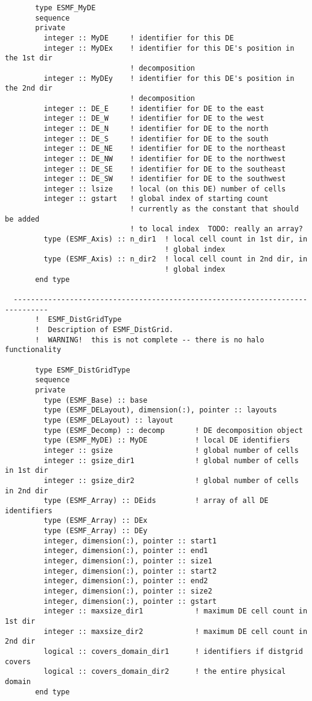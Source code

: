 \begin{verbatim}
       type ESMF_MyDE
       sequence
       private
         integer :: MyDE     ! identifier for this DE
         integer :: MyDEx    ! identifier for this DE's position in the 1st dir
                             ! decomposition
         integer :: MyDEy    ! identifier for this DE's position in the 2nd dir
                             ! decomposition
         integer :: DE_E     ! identifier for DE to the east
         integer :: DE_W     ! identifier for DE to the west
         integer :: DE_N     ! identifier for DE to the north
         integer :: DE_S     ! identifier for DE to the south
         integer :: DE_NE    ! identifier for DE to the northeast
         integer :: DE_NW    ! identifier for DE to the northwest
         integer :: DE_SE    ! identifier for DE to the southeast
         integer :: DE_SW    ! identifier for DE to the southwest
         integer :: lsize    ! local (on this DE) number of cells
         integer :: gstart   ! global index of starting count
                             ! currently as the constant that should be added
                             ! to local index  TODO: really an array?
         type (ESMF_Axis) :: n_dir1  ! local cell count in 1st dir, in
                                     ! global index
         type (ESMF_Axis) :: n_dir2  ! local cell count in 2nd dir, in
                                     ! global index
       end type
 
  ------------------------------------------------------------------------------
       !  ESMF_DistGridType
       !  Description of ESMF_DistGrid. 
       !  WARNING!  this is not complete -- there is no halo functionality
 
       type ESMF_DistGridType
       sequence
       private
         type (ESMF_Base) :: base
         type (ESMF_DELayout), dimension(:), pointer :: layouts
         type (ESMF_DELayout) :: layout
         type (ESMF_Decomp) :: decomp       ! DE decomposition object
         type (ESMF_MyDE) :: MyDE           ! local DE identifiers
         integer :: gsize                   ! global number of cells
         integer :: gsize_dir1              ! global number of cells in 1st dir
         integer :: gsize_dir2              ! global number of cells in 2nd dir
         type (ESMF_Array) :: DEids         ! array of all DE identifiers
         type (ESMF_Array) :: DEx
         type (ESMF_Array) :: DEy
         integer, dimension(:), pointer :: start1
         integer, dimension(:), pointer :: end1
         integer, dimension(:), pointer :: size1
         integer, dimension(:), pointer :: start2
         integer, dimension(:), pointer :: end2
         integer, dimension(:), pointer :: size2
         integer, dimension(:), pointer :: gstart
         integer :: maxsize_dir1            ! maximum DE cell count in 1st dir
         integer :: maxsize_dir2            ! maximum DE cell count in 2nd dir
         logical :: covers_domain_dir1      ! identifiers if distgrid covers
         logical :: covers_domain_dir2      ! the entire physical domain
       end type
 

\end{verbatim}
